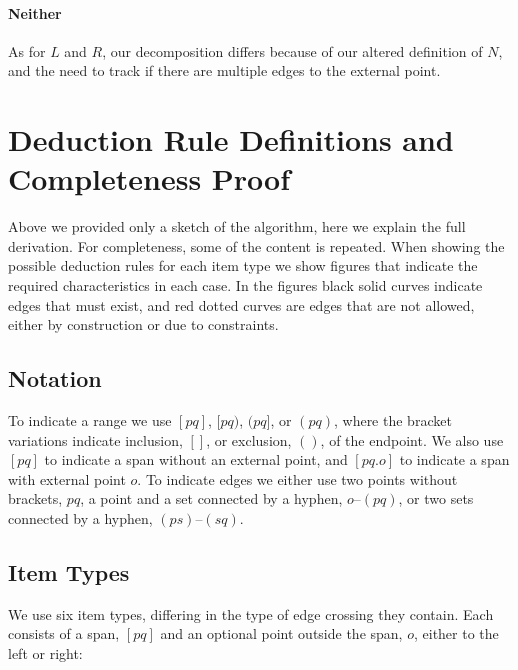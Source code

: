 \paragraph{Neither}
As for $L$ and $R$, our decomposition differs because of our altered definition of $N$, and the need to track if there are multiple edges to the external point.

\section{Deduction Rule Definitions and Completeness Proof} \label{sec:full-algorithm}

Above we provided only a sketch of the algorithm, here we explain the full derivation.
For completeness, some of the content is repeated.
When showing the possible deduction rules for each item type we show figures that indicate the required characteristics in each case.
In the figures black solid curves indicate edges that must exist, and red dotted curves are edges that are not allowed, either by construction or due to constraints.

\subsection{Notation}

To indicate a range we use $[pq]$, $[pq)$, $(pq]$, or $(pq)$, where the bracket variations indicate inclusion, $[]$, or exclusion, $()$, of the endpoint.
We also use $[pq]$ to indicate a span without an external point, and $[pq.o]$ to indicate a span with external point $o$.
To indicate edges we either use two points without brackets, \myeg $pq$, a point and a set connected by a hyphen, \myeg $o$--$(pq)$, or two sets connected by a hyphen, \myeg $(ps)$--$(sq)$.

\subsection{Item Types}

We use six item types, differing in the type of edge crossing they contain.
Each consists of a span, $[pq]$ and an optional point outside the span, $o$, either to the left or right:

